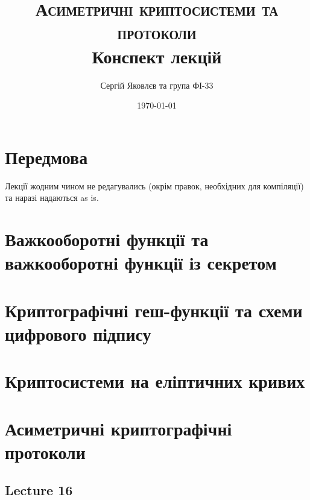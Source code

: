\documentclass[12pt]{report}
\title{\textsc{Асиметричні криптосистеми та протоколи} \\ Конспект лекцій}
\author{Сергій Яковлєв та група ФІ-33}
\date{\today}
\theoremstyle{plain}
\theoremstyle{definition}
\theoremstyle{remark}
\begin{document}
\maketitle
\tableofcontents
\clearpage

\chapter*{Передмова}

Лекції жодним чином не редагувались (окрім правок, необхідних для компіляції) та наразі надаються as is.

\chapter{Важкооборотні функції та важкооборотні функції із секретом}


\chapter{Криптографічні геш-функції та схеми цифрового підпису}


\chapter{Криптосистеми на еліптичних кривих}


\chapter{Асиметричні криптографічні протоколи}

\section{Lecture 16}
\end{document}
